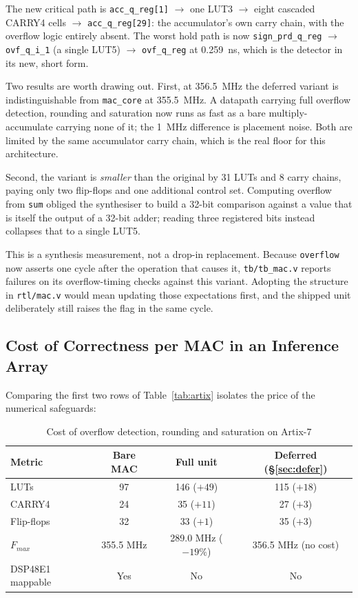 \documentclass[letterpaper,12pt]{article}
\begin{document}
The new critical path is \texttt{acc\_q\_reg[1]} $\rightarrow$ one LUT3
$\rightarrow$ eight cascaded CARRY4 cells $\rightarrow$ \texttt{acc\_q\_reg[29]}:
the accumulator's own carry chain, with the overflow logic entirely absent. The
worst hold path is now \texttt{sign\_prd\_q\_reg} $\rightarrow$ \texttt{ovf\_q\_i\_1}
(a single LUT5) $\rightarrow$ \texttt{ovf\_q\_reg} at 0.259~ns, which is the
detector in its new, short form.

Two results are worth drawing out. First, at 356.5~MHz the deferred variant is
indistinguishable from \texttt{mac\_core} at 355.5~MHz. A datapath carrying full
overflow detection, rounding and saturation now runs as fast as a bare
multiply-accumulate carrying none of it; the 1~MHz difference is placement
noise. Both are limited by the same accumulator carry chain, which is the real
floor for this architecture.

Second, the variant is \emph{smaller} than the original by 31 LUTs and 8 carry
chains, paying only two flip-flops and one additional control set. Computing
overflow from \texttt{sum} obliged the synthesiser to build a 32-bit comparison
against a value that is itself the output of a 32-bit adder; reading three
registered bits instead collapses that to a single LUT5.

This is a synthesis measurement, not a drop-in replacement. Because
\texttt{overflow} now asserts one cycle after the operation that causes it,
\texttt{tb/tb\_mac.v} reports failures on its overflow-timing checks against
this variant. Adopting the structure in \texttt{rtl/mac.v} would mean updating
those expectations first, and the shipped unit deliberately still raises the
flag in the same cycle.

\subsection{Cost of Correctness per MAC in an Inference Array}

Comparing the first two rows of Table~\ref{tab:artix} isolates the price of the
numerical safeguards:

\begin{table}[H]
\centering
\caption{Cost of overflow detection, rounding and saturation on Artix-7}
\label{tab:cost}
\renewcommand{\arraystretch}{1.3}
\begin{tabular}{|l|c|c|c|}
\hline
\textbf{Metric} & \textbf{Bare MAC} & \textbf{Full unit} & \textbf{Deferred (\S\ref{sec:defer})} \\
\hline
LUTs        & 97        & 146 ($+49$)       & 115 ($+18$) \\
CARRY4      & 24        & 35 ($+11$)        & 27 ($+3$) \\
Flip-flops  & 32        & 33 ($+1$)         & 35 ($+3$) \\
$F_{max}$   & 355.5 MHz & 289.0 MHz ($-19\%$) & 356.5 MHz (no cost) \\
DSP48E1 mappable & Yes  & No        & No \\
\hline
\end{tabular}
\end{table}
\end{document}
